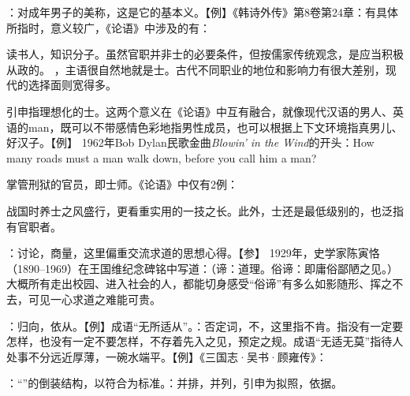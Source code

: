 {
\item {}：对成年男子的美称，这是它的基本义。【例】《韩诗外传》第8卷第24章：有具体所指时，意义较广，《论语》中涉及的有：
\begin{lyitemize}
\item 读书人，知识分子。虽然官职并非士的必要条件，但按儒家传统观念，是应当积极从政的。 ，主语很自然地就是士。古代不同职业的地位和影响力有很大差别，现代的选择面则宽得多。%
\item 引申指理想化的士。这两个意义在《论语》中互有融合，就像现代汉语的男人、英语的man，既可以不带感情色彩地指男性成员，也可以根据上下文环境指真男儿、好汉子。【例】  1962年Bob Dylan民歌金曲\emph{Blowin' in the Wind}的开头：How many roads must a man walk down, before you call him a man?

\item {}掌管刑狱的官员，即士师。《论语》中仅有2例：   
\end{lyitemize}
战国时养士之风盛行，更看重实用的一技之长。此外，士还是最低级别的，也泛指有官职者。
\item {}：讨论，商量，这里偏重交流求道的思想心得。【参】 1929年，史学家陈寅恪（1890--1969）在王国维纪念碑铭中写道：（谛：道理。俗谛：即庸俗鄙陋之见。）大概所有走出校园、进入社会的人，都能切身感受“俗谛”有多么如影随形、挥之不去，可见一心求道之难能可贵。
}
{}


{
\item {}：归向，依从。【例】成语“无所适从”。：否定词，不，这里指不肯。指没有一定要怎样，也没有一定不要怎样，不存着先入之见，预定之规。成语“无适无莫”指待人处事不分远近厚薄，一碗水端平。【例】《三国志·吴书·顾雍传》： %
\item {}：“”的倒装结构，以符合为标准。：并排，并列，引申为拟照，依据。
}
{}


